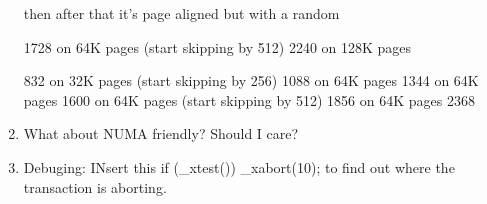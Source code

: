 \begin{enumerate}
      then after that it's page aligned but with a random 

        1728 on 64K pages (start skipping by 512)
        2240 on 128K pages

        832 on 32K pages   (start skipping by 256)
        1088 on 64K pages
        1344 on 64K pages
        1600 on 64K pages  (start skipping by 512) 
        1856 on 64K pages 
        2368

\item What about NUMA friendly?  Should I care?

\item Debuging: INsert this
    if (_xtest()) _xabort(10);
to find out where the transaction is aborting.

\end{enumerate}
